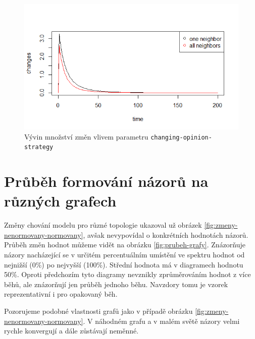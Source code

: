 \documentclass[10pt,a4paper]{report}
\begin{document}
\begin{figure}[h]
  \includegraphics[width=\textwidth]{plots/random-g/randomAllVsOne.png}
  \caption{Vývin množství změn vlivem parametru \texttt{changing-opinion-strategy}}
  \label{fig:zmeny-strategie}
\end{figure}

\section{Průběh formování názorů na různých grafech}
Změny chování modelu pro různé topologie ukazoval už obrázek \ref{fig:zmeny-nenormovany-normovany}, avšak nevypovídal o konkrétních hodnotách názorů. Průběh změn hodnot můžeme vidět na obrázku \ref{fig:prubeh-grafy}. Znázorňuje názory nacházející se v určitém percentuálním umístění ve spektru hodnot od nejnižší (0\thinspace\%) po nejvyšší (100\thinspace\%). Střední hodnota má v diagramech hodnotu 50\thinspace\%. Oproti předchozím tyto diagramy nevznikly zprůměrováním hodnot z více běhů, ale znázorňují jen průběh jednoho běhu. Navzdory tomu je vzorek reprezentativní i pro opakovaný běh.

Pozorujeme podobné vlastnosti grafů jako v případě obrázku \ref{fig:zmeny-nenormovany-normovany}. V náhodném grafu a v malém světě názory velmi rychle konvergují a dále zůstávají neměnné.
\end{document}
